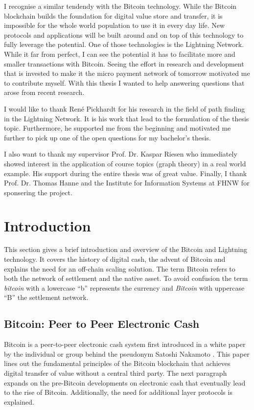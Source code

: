 \documentclass[final]{fhnwreport}       %
\begin{document}
I recognise a similar tendendy with the Bitcoin technology. While the Bitcoin blockchain builds the foundation for digital value store and transfer, it is impossible for the whole world population to use it in every day life. New protocols and applications will be built around and on top of this technology to fully leverage the potential. One of those technologies is the Lightning Network. While it far from perfect, I can see the potential it has to facilitate more and smaller transactions with Bitcoin. Seeing the effort in research and development that is invested to make it the micro payment network of tomorrow motivated me to contribute myself. With this thesis I wanted to help answering questions that arose from recent research.

I would like to thank René Pickhardt for his research in the field of path finding in the Lightning Network. It is his work that lead to the formulation of the thesis topic. Furthermore, he supported me from the beginning and motivated me further to pick up one of the open questions for my bachelor's thesis.

I also want to thank my supervisor Prof. Dr. Kaspar Riesen who immediately showed interest in the application of course topics (graph theory) in a real world example. His support during the entire thesis was of great value. Finally, I thank Prof. Dr. Thomas Hanne and the Institute for Information Systems at FHNW for sponsering the project.

\clearpage
{}
\section{Introduction} 
This section gives a brief introduction and overview of the Bitcoin and Lightning technology. It covers the history of digital cash, the advent of Bitcoin and explains the need for an off-chain scaling solution. The term Bitcoin refers to both the network of settlement and the native asset. To avoid confusion the term \emph{bitcoin} with a lowercase ``b'' represents the currency and \emph{Bitcoin} with uppercase ``B'' the settlement network.

\subsection{Bitcoin: Peer to Peer Electronic Cash}\label{subsec:peertopeer}
Bitcoin is a peer-to-peer electronic cash system first introduced in a white paper by the individual or group behind the pseudonym Satoshi Nakamoto \citep{nakamoto_bitcoin_2008}. This paper lines out the fundamental principles of the Bitcoin \gls{blockchain} that achieves digital transfer of value without a central third party. The next paragraph expands on the pre-Bitcoin developments on electronic cash that eventually lead to the rise of Bitcoin. Additionally, the need for additional layer protocols is explained.
\end{document}

